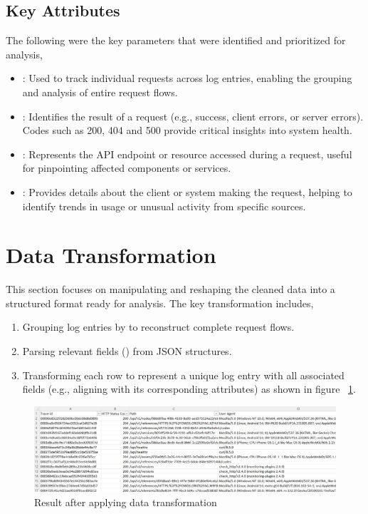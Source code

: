 \subsection{Key Attributes}
The following were the key parameters that were identified and prioritized for analysis,
\begin{itemize}
	\item {}: Used to track individual requests across log entries, enabling the grouping and analysis of entire request flows.
	\item {}: Identifies the result of a request (e.g., success, client errors, or server errors). Codes such as 200, 404 and 500 provide critical insights into system health.
	\item {}: Represents the API endpoint or resource accessed during a request, useful for pinpointing affected components or services.
	\item {}: Provides details about the client or system making the request, helping to identify trends in usage or unusual activity from specific sources.
\end{itemize}

\section{Data Transformation}

This section focuses on manipulating and reshaping the cleaned data into a structured format ready for analysis. The key transformation includes,

\begin{enumerate}
	\item Grouping log entries by  to reconstruct complete request flows.
	\item Parsing relevant fields () from JSON structures.
	\item Transforming each row to represent a unique log entry with all associated fields (e.g., aligning  with its corresponding attributes) as shown in figure ~\ref{DataTrans}.
\end{enumerate}

\begin{figure}
	\begin{center}
		\includegraphics[width=0.9\linewidth]{Images/DataTransformation.png}
		\caption{Result after applying data transformation}
		\label{DataTrans} 
	\end{center}
\end{figure}

